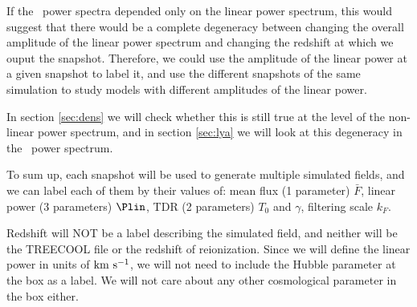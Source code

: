 If the \lya\ power spectra depended only on the linear power spectrum, this 
would suggest that there would be a complete degeneracy between changing 
the overall amplitude of the linear power spectrum and changing the redshift
at which we ouput the snapshot. 
Therefore, we could use the amplitude of the linear power at a given snapshot
to label it, and use the different snapshots of the same simulation to study 
models with different amplitudes of the linear power. 

In section \ref{sec:dens} we will check whether this is still true at the 
level of the non-linear power spectrum, and in section \ref{sec:lya} we 
will look at this degeneracy in the \lya\ power spectrum. 


To sum up, each snapshot will be used to generate multiple simulated 
fields, and we can label each of them by their values of: 
mean flux (1 parameter) $\bar F$,
linear power (3 parameters) $\Plin$,
TDR (2 parameters) $T_0$ and $\gamma$, 
filtering scale $k_F$.

Redshift will NOT be a label describing the simulated field, and neither
will be the TREECOOL file or the redshift of reionization.
Since we will define the linear power in units of ${\rm km~s^{-1}}$, we will not 
need to include the Hubble parameter at the box as a label.
We will not care about any other cosmological parameter in the box
either.
